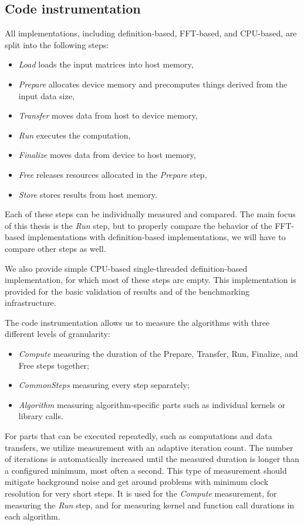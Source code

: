 \subsection{Code instrumentation}
\label{sec:code_instrumentation}

All implementations, including definition-based, FFT-based, and CPU-based, are split into the following steps:

\begin{itemize}
	\item \textit{Load} loads the input matrices into host memory,
	\item \textit{Prepare} allocates device memory and precomputes things derived from the input data size,
	\item \textit{Transfer} moves data from host to device memory,
	\item \textit{Run} executes the computation,
	\item \textit{Finalize} moves data from device to host memory,
	\item \textit{Free} releases resources allocated in the \textit{Prepare} step,
	\item \textit{Store} stores results from host memory.
\end{itemize}

Each of these steps can be individually measured and compared. The main focus of this thesis is the \textit{Run} step, but to properly compare the behavior of the FFT-based implementations with definition-based implementations, we will have to compare other steps as well.

We also provide simple CPU-based single-threaded definition-based implementation, for which most of these steps are empty. This implementation is provided for the basic validation of results and of the benchmarking infrastructure. 


The code instrumentation allows us to measure the algorithms with three different levels of granularity:
\begin{itemize}
	\item \textit{Compute} measuring the duration of the Prepare, Transfer, Run, Finalize, and Free steps together;
	\item \textit{CommonSteps} measuring every step separately;
	\item \textit{Algorithm} measuring algorithm-specific parts such as individual kernels or library calls.
\end{itemize}

For parts that can be executed repeatedly, such as computations and data transfers, we utilize measurement with an adaptive iteration count. The number of iterations is automatically increased until the measured duration is longer than a configured minimum, most often a second. This type of measurement should mitigate background noise and get around problems with minimum clock resolution for very short steps. It is used for the \textit{Compute} measurement, for measuring the \textit{Run} step, and for measuring kernel and function call durations in each algorithm.

